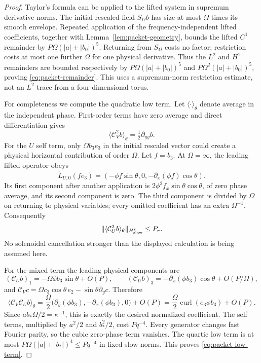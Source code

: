 \documentclass[11pt,a4paper]{amsart}
\theoremstyle{definition}
\theoremstyle{remark}
\numberwithin{equation}{section}
\newcommand{\Ccal}{\mathcal C}
\newcommand{\norm}[1]{\lVert #1\rVert}
\newcommand{\curl}{\operatorname{curl}}
\begin{document}
\begin{proof}
Taylor's formula can be applied to the lifted system in supremum derivative
norms.  The initial rescaled field $S_\Omega b$ has size at most $\Omega$ times its smooth
envelope.  Repeated application of the frequency-independent lifted
coefficients, together with Lemma~\ref{lem:packet-geometry}, bounds the lifted
$C^1$ remainder by $P\Omega (|a|+|b_0|)^5$.  Returning from $S_\Omega $ costs no factor;
restriction costs at most one further $\Omega$ for one physical derivative.  Thus
the $L^2$ and $H^1$ remainders are bounded respectively by
$P\Omega (|a|+|b_0|)^5$ and $P\Omega ^2(|a|+|b_0|)^5$, proving
\eqref{eq:packet-remainder}.  This uses a supremum-norm restriction estimate,
not an $L^2$ trace from a four-dimensional torus.

For completeness we compute the quadratic low term.  Let $\langle\cdot
\rangle_\theta$ denote average in the independent phase.  First-order terms
have zero average and direct differentiation gives
\begin{equation}\label{eq:packet-V-self}
 \langle\Ccal_V^2b\rangle_\theta=\tfrac12\partial_{yy}b.
\end{equation}
For the $U$ self term, only $\Omega b_3e_3$ in the initial rescaled vector could
create a physical horizontal contribution of order $\Omega$.  Let $f=b_3$.  At
$\Omega=\infty$, the leading lifted operator obeys
\[
 \widetilde L_{U,0}(fe_3)
   =(-\phi f\sin\theta,0,-\partial_x(\phi f)\cos\theta).
\]
Its first component after another application is
$2\phi^2f_x\sin\theta\cos\theta$, of zero phase average, and its second
component is zero.  The third component is divided by $\Omega$ on returning to
physical variables; every omitted coefficient has an extra $\Omega^{-1}$.
Consequently
\begin{equation}\label{eq:packet-U-self}
 \norm{\langle\Ccal_U^2b\rangle_\theta}_{H^r_{\rm slow}}\le P_r.
\end{equation}
No solenoidal cancellation stronger than the displayed calculation is being
assumed here.

For the mixed term the leading physical components are
\[
 (\Ccal_Ub)_1=-\Omega\phi b_3\sin\theta+O(P),\qquad
 (\Ccal_Ub)_3=-\partial_x(\phi b_3)\cos\theta+O(P/\Omega),
\]
and $\Ccal_Vc=\Omega c_3\cos\theta\,e_2-\sin\theta\partial_yc$.
Therefore
\begin{equation}\label{eq:packet-mixed}
 \langle\Ccal_V\Ccal_Ub\rangle_\theta
 =\frac{\Omega}{2}\bigl(\partial_y(\phi b_3),-\partial_x(\phi b_3),0\bigr)+O(P)
 =\frac{\Omega}{2}\curl(e_3\phi b_3)+O(P).
\end{equation}
Since $ab_*\Omega/2=\kappa^{-1}$, this is exactly the desired normalized
coefficient.  The self terms, multiplied by $a^2/2$ and $b_*^2/2$, cost
$Pq^{-4}$.  Every generator changes fast Fourier parity, so the cubic
zero-phase term vanishes.  The quartic low term is at most
$P\Omega (|a|+|b_*|)^4\le Pq^{-4}$ in fixed slow norms.  This proves
\eqref{eq:packet-low-term}.


\end{proof}
\end{document}
